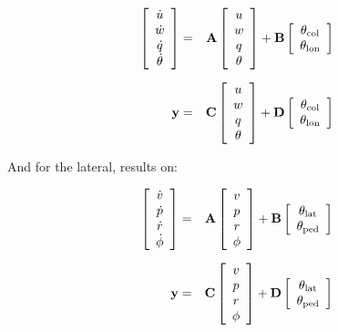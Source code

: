     \begin{eqnarray}
      \left[ \begin{array}{c} \dot{u} \\ \dot{w} \\ \dot{q} \\ \dot{\theta} \end{array} \right] &=& \mathrm{\textbf{A}} \left[ \begin{array}{c} u \\ w \\ q \\ \theta \end{array} \right] + \mathrm{\textbf{B}} \left[ \begin{array}{c} \theta_{\mathrm{col}} \\ \theta_{\mathrm{lon}} \end{array} \right] \\[6pt]
      \mathrm{\textbf{y}} &=& \mathrm{\textbf{C}} \left[ \begin{array}{c} u \\ w \\ q \\ \theta \end{array} \right] + \mathrm{\textbf{D}} \left[ \begin{array}{c} \theta_{\mathrm{col}} \\ \theta_{\mathrm{lon}} \end{array} \right]
    \end{eqnarray}

    And for the lateral, results on:

    \begin{eqnarray}
      \left[ \begin{array}{c} \dot{v} \\ \dot{p} \\ \dot{r} \\ \dot{\phi} \end{array} \right] &=& \mathrm{\textbf{A}} \left[ \begin{array}{c} v \\ p \\ r \\ \phi \end{array} \right] + \mathrm{\textbf{B}} \left[ \begin{array}{c} \theta_{\mathrm{lat}} \\ \theta_{\mathrm{ped}} \end{array} \right] \\[6pt]
      \mathrm{\textbf{y}} &=& \mathrm{\textbf{C}} \left[ \begin{array}{c} v \\ p \\ r \\ \phi \end{array} \right] + \mathrm{\textbf{D}} \left[ \begin{array}{c} \theta_{\mathrm{lat}} \\ \theta_{\mathrm{ped}} \end{array} \right]
    \end{eqnarray}